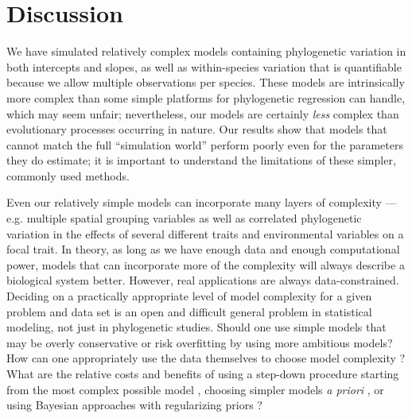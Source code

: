 \documentclass[12pt]{article}
\begin{document}

\newpage

\section*{Discussion}



We have simulated relatively complex models containing phylogenetic variation in both intercepts and slopes, as well as within-species variation that is quantifiable because we allow multiple observations per species.
These models are intrinsically more complex than some simple platforms for phylogenetic regression can handle, which may seem unfair; nevertheless, our models are certainly \emph{less} complex than evolutionary processes occurring in nature.
Our results show that models that cannot match the full ``simulation world'' perform poorly even for the parameters they do estimate; it is important to understand the limitations of these simpler, commonly used methods.

Even our relatively simple models can incorporate many layers of complexity --- e.g. multiple spatial grouping variables as well as correlated phylogenetic variation in the effects of several different traits and environmental variables on a focal trait.
In theory, as long as we have enough data and enough computational power, models that can incorporate more of the complexity will always describe a biological system better.
However, real applications are always data-constrained.
Deciding on a practically appropriate level of model complexity for a given
problem and data set is an
open and difficult general problem in statistical modeling, not just
in phylogenetic studies.
Should one use simple models that may be overly conservative or
risk overfitting by using more ambitious models?
How can one appropriately use the data themselves
to choose model complexity \citep{roberts_cross-validation_2016}?
What are the relative costs and benefits of using a step-down procedure
starting from the most complex possible model \citep{barr2013random},
choosing simpler models \emph{a priori} \citep{baayen2008mixed},
or using Bayesian approaches with regularizing priors \citep{hadfield2010mcmc}?
\end{document}
